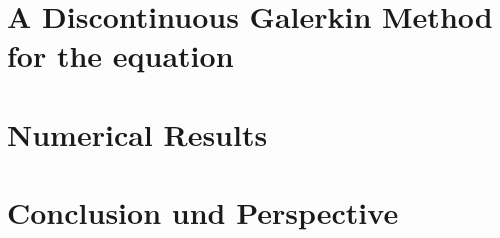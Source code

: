 \documentclass{template}
\begin{document}
\chapter{A Discontinuous Galerkin Method for the \MA equation}
\label{ch:ourMethod}


\chapter{Numerical Results}
\label{ch:NumericalResults}



\chapter{Conclusion und Perspective}
\label{ch:conclusion}


\newpage
%
\newpage


\end{document}

